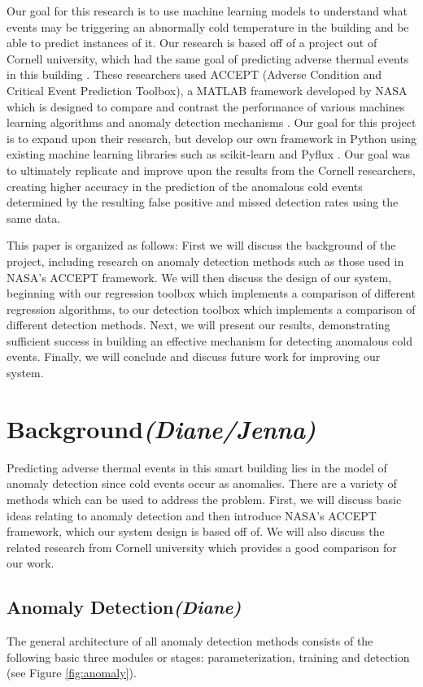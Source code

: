 \documentclass{acm_proc_article-sp}
\begin{document}
Our goal for this research is to use machine learning models to understand what events may be triggering an abnormally cold temperature in the building and be able to predict instances of it. Our research is based off of a project out of Cornell university, which had the same goal of predicting adverse thermal events in this building \cite{Cornell}. These researchers used ACCEPT (Adverse Condition and Critical Event Prediction Toolbox), a MATLAB framework developed by NASA which is designed to compare and contrast the performance of various machines learning algorithms and anomaly detection mechanisms \cite{accept}. Our goal for this project is to expand upon their research, but develop our own framework in Python using existing machine learning libraries such as scikit-learn \cite{scikitlearn} and Pyflux \cite{pyflux}. Our goal was to ultimately replicate and improve upon the results from the Cornell researchers, creating higher accuracy in the prediction of the anomalous cold events determined by the resulting false positive and missed detection rates using the same data.

This paper is organized as follows: First we will discuss the background of the project, including research on anomaly detection methods such as those used in NASA's ACCEPT framework. We will then discuss the design of our system, beginning with our regression toolbox which implements a comparison of different regression algorithms, to our detection toolbox which implements a comparison of different detection methods. Next, we will present our results, demonstrating sufficient success in building an effective mechanism for detecting anomalous cold events. Finally, we will conclude and discuss future work for improving our system.

\section{Background\textit{(Diane/Jenna)}} 
Predicting adverse thermal events in this smart building lies in the model of anomaly detection since cold events occur as anomalies. There are a variety of methods which can be used to address the problem. First, we will discuss basic ideas relating to anomaly detection and then introduce NASA's ACCEPT framework, which our system design is based off of. We will also discuss the related research from Cornell university which provides a good comparison for our work.

\subsection{Anomaly Detection\textit{(Diane)}}
The general architecture of all anomaly detection methods consists of the following basic three modules or stages: parameterization, training and detection (see Figure \ref{fig:anomaly}).
\end{document}
